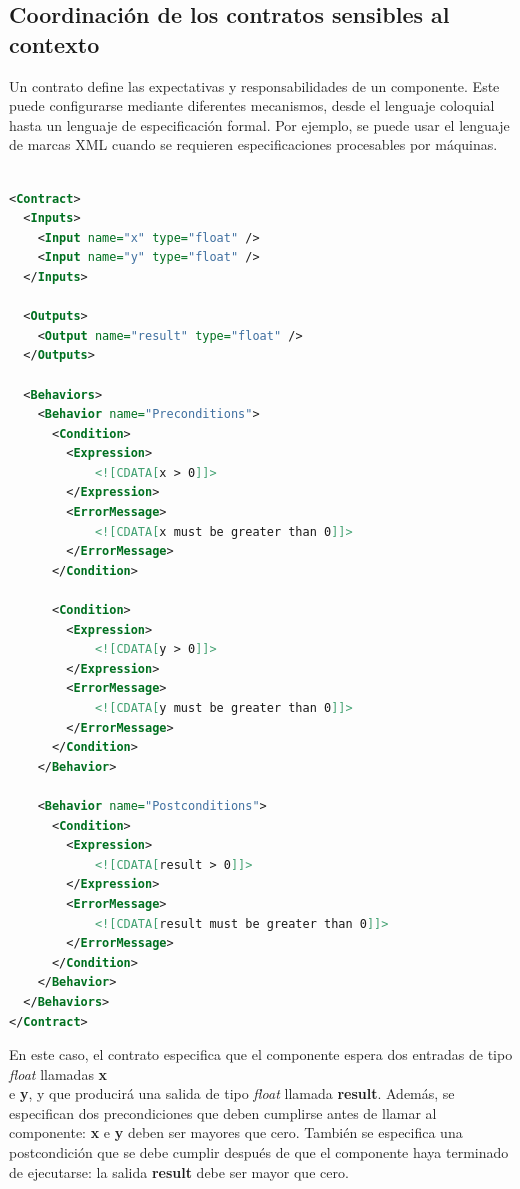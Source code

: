 \begin{itemize}
\subsection{Coordinación de los contratos sensibles al contexto}

Un contrato define las expectativas y responsabilidades de un componente. Este puede configurarse mediante diferentes mecanismos, desde el lenguaje coloquial hasta un lenguaje de especificación formal. Por ejemplo, se puede usar el lenguaje de marcas XML cuando se requieren especificaciones procesables por máquinas. 


\begin{lstlisting}[language=XML]
    
<Contract>
  <Inputs>
    <Input name="x" type="float" />
    <Input name="y" type="float" />
  </Inputs>

  <Outputs>
    <Output name="result" type="float" />
  </Outputs>
  
  <Behaviors>
    <Behavior name="Preconditions">
      <Condition>
        <Expression>
            <![CDATA[x > 0]]>
        </Expression>
        <ErrorMessage>
            <![CDATA[x must be greater than 0]]>
        </ErrorMessage>
      </Condition>
      
      <Condition>
        <Expression>
            <![CDATA[y > 0]]>
        </Expression>
        <ErrorMessage>
            <![CDATA[y must be greater than 0]]>
        </ErrorMessage>
      </Condition> 
    </Behavior>
  
    <Behavior name="Postconditions">
      <Condition>
        <Expression>
            <![CDATA[result > 0]]>
        </Expression>
        <ErrorMessage>
            <![CDATA[result must be greater than 0]]>
        </ErrorMessage>
      </Condition>
    </Behavior>
  </Behaviors>
</Contract>

\end{lstlisting}


En este caso, el contrato especifica que el componente espera dos entradas de tipo \textit{float} llamadas \textbf{x} \\e \textbf{y}, y que producirá una salida de tipo \textit{float} llamada \textbf{result}. Además, se especifican dos precondiciones que deben cumplirse antes de llamar al componente: \textbf{x} e \textbf{y} deben ser mayores que cero. También se especifica una postcondición que se debe cumplir después de que el componente haya terminado de ejecutarse: la salida \textbf{result} debe ser mayor que cero.



\end{itemize}
